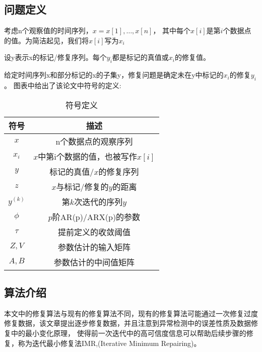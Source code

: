 \documentclass[12pt,a4paper]{article}
\begin{document}
\subsection{问题定义}
考虑n个观察值的时间序列，$x=x[1], \ldots, x[n]$，
其中每个$x[i]$是第$i$个数据点的值。为简洁起见，我们将$x[i]$写为$x_i$
\par
设y表示x的标记/修复序列。每个$y_i$都是标记的真值或$x_i$的修复值。
\par
给定时间序列x和部分标记的x的子集y，修复问题是确定未在y中标记的$x_i$的修复$y_i$。
图表中给出了该论文中符号的定义:
\begin{table}[h]
    \centering
    \begin{tabular}{@{}|c|c|@{}}
    \toprule
    符号        & 描述                     \\ \midrule
    $x$       & n个数据点的观察序列             \\ \midrule
    $x_i$     & $x$中第i个数据的值，也被写作$x[i]$ \\ \midrule
    $y$       & 标记的真值/$x$的修复序列         \\ \midrule
    $z$       & $x$与标记/修复的$y$的距离       \\ \midrule
    $y^{(k)}$ & 第$k$次迭代的序列$y$          \\ \midrule
    $\phi$    & $p$阶AR(p)/ARX(p)的参数    \\ \midrule
    $\tau$    & 提前定义的收敛阈值              \\ \midrule
    $Z,V$     & 参数估计的输入矩阵              \\ \midrule
    $A,B$     & 参数估计的中间值矩阵             \\ \bottomrule
    \end{tabular}
    \caption{符号定义}
\end{table}

\subsection{算法介绍}
本文中的修复算法与现有的修复算法不同，现有的修复算法可能通过一次修复过度修复数据，该文章提出逐步修复数据，并且注意到异常检测中的误差性质及数据修复中的最小变化原理，
使得前一次迭代中的高可信度信息可以帮助后续步骤的修复，称为迭代最小修复法IMR,(Iterative Minimum Repairing)。
\end{document}
